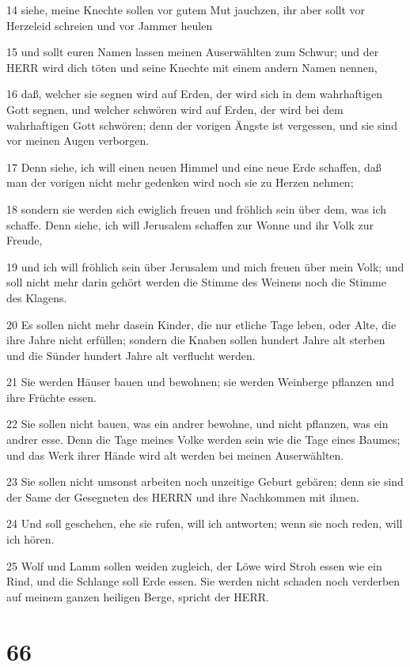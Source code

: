 \par 14 siehe, meine Knechte sollen vor gutem Mut jauchzen, ihr aber sollt vor Herzeleid schreien und vor Jammer heulen
\par 15 und sollt euren Namen lassen meinen Auserwählten zum Schwur; und der HERR wird dich töten und seine Knechte mit einem andern Namen nennen,
\par 16 daß, welcher sie segnen wird auf Erden, der wird sich in dem wahrhaftigen Gott segnen, und welcher schwören wird auf Erden, der wird bei dem wahrhaftigen Gott schwören; denn der vorigen Ängste ist vergessen, und sie sind vor meinen Augen verborgen.
\par 17 Denn siehe, ich will einen neuen Himmel und eine neue Erde schaffen, daß man der vorigen nicht mehr gedenken wird noch sie zu Herzen nehmen;
\par 18 sondern sie werden sich ewiglich freuen und fröhlich sein über dem, was ich schaffe. Denn siehe, ich will Jerusalem schaffen zur Wonne und ihr Volk zur Freude,
\par 19 und ich will fröhlich sein über Jerusalem und mich freuen über mein Volk; und soll nicht mehr darin gehört werden die Stimme des Weinens noch die Stimme des Klagens.
\par 20 Es sollen nicht mehr dasein Kinder, die nur etliche Tage leben, oder Alte, die ihre Jahre nicht erfüllen; sondern die Knaben sollen hundert Jahre alt sterben und die Sünder hundert Jahre alt verflucht werden.
\par 21 Sie werden Häuser bauen und bewohnen; sie werden Weinberge pflanzen und ihre Früchte essen.
\par 22 Sie sollen nicht bauen, was ein andrer bewohne, und nicht pflanzen, was ein andrer esse. Denn die Tage meines Volke werden sein wie die Tage eines Baumes; und das Werk ihrer Hände wird alt werden bei meinen Auserwählten.
\par 23 Sie sollen nicht umsonst arbeiten noch unzeitige Geburt gebären; denn sie sind der Same der Gesegneten des HERRN und ihre Nachkommen mit ihnen.
\par 24 Und soll geschehen, ehe sie rufen, will ich antworten; wenn sie noch reden, will ich hören.
\par 25 Wolf und Lamm sollen weiden zugleich, der Löwe wird Stroh essen wie ein Rind, und die Schlange soll Erde essen. Sie werden nicht schaden noch verderben auf meinem ganzen heiligen Berge, spricht der HERR.

\chapter{66}

